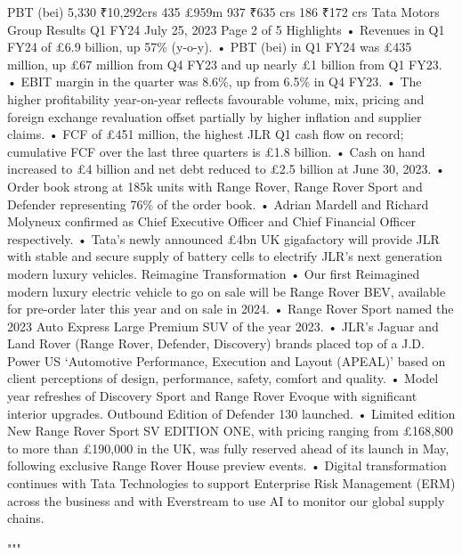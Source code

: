 \documentclass[
  letterpaper,
  DIV=11,
  numbers=noendperiod]{scrreprt}
\newenvironment{Shaded}{\begin{snugshade}}{\end{snugshade}}
\newcommand{\SpecialCharTok}[1]{\textcolor[rgb]{0.37,0.37,0.37}{#1}}
\newcommand{\StringTok}[1]{\textcolor[rgb]{0.13,0.47,0.30}{#1}}
\begin{document}
\begin{Shaded}
\begin{Highlighting}[]
\StringTok{PBT (bei) 5,330 ₹10,292crs 435 £959m 937 ₹635 crs 186 ₹172 crs}
\StringTok{Tata Motors Group Results Q1 FY24 July 25, 2023}
\StringTok{Page 2 of 5}
\StringTok{Highlights}
\StringTok{• Revenues in Q1 FY24 of £6.9 billion, up 57\% (y{-}o{-}y).}
\StringTok{• PBT (bei) in Q1 FY24 was £435 million, up £67 million from Q4 FY23 and up nearly £1 billion from Q1 FY23.}
\StringTok{• EBIT margin in the quarter was 8.6\%, up from 6.5}\SpecialCharTok{\% i}\StringTok{n Q4 FY23.}
\StringTok{• The higher profitability year{-}on{-}year reflects favourable volume, mix, pricing and foreign exchange revaluation}
\StringTok{offset partially by higher inflation and supplier claims.}
\StringTok{• FCF of £451 million, the highest JLR Q1 cash flow on record; cumulative FCF over the last three quarters is £1.8}
\StringTok{billion.}
\StringTok{• Cash on hand increased to £4 billion and net debt reduced to £2.5 billion at June 30, 2023.}
\StringTok{• Order book strong at 185k units with Range Rover, Range Rover Sport and Defender representing 76}\SpecialCharTok{\% o}\StringTok{f the order}
\StringTok{book.}
\StringTok{• Adrian Mardell and Richard Molyneux confirmed as Chief Executive Officer and Chief Financial Officer respectively.}
\StringTok{• Tata’s newly announced £4bn UK gigafactory will provide JLR with stable and secure supply of battery cells to}
\StringTok{electrify JLR’s next generation modern luxury vehicles.}
\StringTok{Reimagine Transformation}
\StringTok{• Our first Reimagined modern luxury electric vehicle to go on sale will be Range Rover BEV, available for pre{-}order}
\StringTok{later this year and on sale in 2024.}
\StringTok{• Range Rover Sport named the 2023 Auto Express Large Premium SUV of the year 2023.}
\StringTok{• JLR’s Jaguar and Land Rover (Range Rover, Defender, Discovery) brands placed top of a J.D. Power US ‘Automotive}
\StringTok{Performance, Execution and Layout (APEAL)’ based on client perceptions of design, performance, safety, comfort}
\StringTok{and quality.}
\StringTok{• Model year refreshes of Discovery Sport and Range Rover Evoque with significant interior upgrades. Outbound}
\StringTok{Edition of Defender 130 launched.}
\StringTok{• Limited edition New Range Rover Sport SV EDITION ONE, with pricing ranging from £168,800 to more than}
\StringTok{£190,000 in the UK, was fully reserved ahead of its launch in May, following exclusive Range Rover House preview}
\StringTok{events.}
\StringTok{• Digital transformation continues with Tata Technologies to support Enterprise Risk Management (ERM) across the}
\StringTok{business and with Everstream to use AI to monitor our global supply chains.}

\StringTok{"""}
\end{Highlighting}
\end{Shaded}
\end{document}
